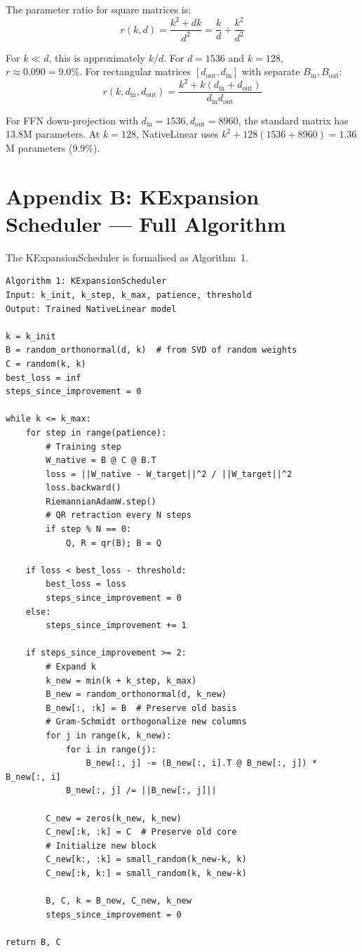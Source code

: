 \documentclass[11pt,a4paper]{article}
\begin{document}
The parameter ratio for square matrices is:
\begin{equation}
r(k, d) = \frac{k^2 + dk}{d^2} = \frac{k}{d} + \frac{k^2}{d^2}
\end{equation}

For $k \ll d$, this is approximately $k/d$. For $d=1536$ and $k=128$, $r \approx 0.090 = 9.0\%$. For rectangular matrices $[d_{\mathrm{out}}, d_{\mathrm{in}}]$ with separate $B_{\mathrm{in}}, B_{\mathrm{out}}$:
\begin{equation}
r(k, d_{\mathrm{in}}, d_{\mathrm{out}}) = \frac{k^2 + k(d_{\mathrm{in}} + d_{\mathrm{out}})}{d_{\mathrm{in}} d_{\mathrm{out}}}
\end{equation}

For FFN down-projection with $d_{\mathrm{in}}=1536, d_{\mathrm{out}}=8960$, the standard matrix has 13.8M parameters. At $k=128$, NativeLinear uses $k^2 + 128(1536+8960) = 1.36$M parameters (9.9\%).

\newpage

\section{Appendix B: KExpansion Scheduler --- Full Algorithm}

The KExpansionScheduler is formalised as Algorithm~1.

\begin{verbatim}
Algorithm 1: KExpansionScheduler
Input: k_init, k_step, k_max, patience, threshold
Output: Trained NativeLinear model

k = k_init
B = random_orthonormal(d, k)  # from SVD of random weights
C = random(k, k)
best_loss = inf
steps_since_improvement = 0

while k <= k_max:
    for step in range(patience):
        # Training step
        W_native = B @ C @ B.T
        loss = ||W_native - W_target||^2 / ||W_target||^2
        loss.backward()
        RiemannianAdamW.step()
        # QR retraction every N steps
        if step % N == 0:
            Q, R = qr(B); B = Q
    
    if loss < best_loss - threshold:
        best_loss = loss
        steps_since_improvement = 0
    else:
        steps_since_improvement += 1
    
    if steps_since_improvement >= 2:
        # Expand k
        k_new = min(k + k_step, k_max)
        B_new = random_orthonormal(d, k_new)
        B_new[:, :k] = B  # Preserve old basis
        # Gram-Schmidt orthogonalize new columns
        for j in range(k, k_new):
            for i in range(j):
                B_new[:, j] -= (B_new[:, i].T @ B_new[:, j]) * B_new[:, i]
            B_new[:, j] /= ||B_new[:, j]||
        
        C_new = zeros(k_new, k_new)
        C_new[:k, :k] = C  # Preserve old core
        # Initialize new block
        C_new[k:, :k] = small_random(k_new-k, k)
        C_new[:k, k:] = small_random(k, k_new-k)
        
        B, C, k = B_new, C_new, k_new
        steps_since_improvement = 0

return B, C
\end{verbatim}
\end{document}
